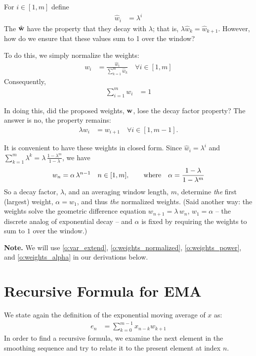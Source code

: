 \documentclass{article}
\begin{document}
For $i \in [1, m]$ define
\begin{align}
    {\hat w}_i &= \lambda^i 
\end{align}
The ${\hat {\bf w}}$ have the property that they decay with $\lambda$;
that is, $\lambda {\hat w}_{k} = {\hat w}_{k+1}$. However, how do we ensure that
these values sum to 1 over the window? 

To do this, we simply normalize the weights:
\begin{align}
    w_i &=  \frac{{\hat w}_i}{\sum_{k=1}^m {\hat w}_k} \quad \forall i \in [1, m] 
\end{align}
Consequently,
\begin{align}
    \sum_{i=1}^m w_i &= 1 \label{o:weights_normalized}
\end{align}

In doing this, did the proposed weights, ${\bf w}$, lose the decay factor
property? The answer is no, the property remains: 
\begin{align}
    \lambda w_{i} &= w_{i+1} \quad \forall i \in [1, m-1].  \label{o:weights_power}
\end{align}

It is convenient to have these weights in closed form. Since
${\hat w}_i = \lambda^i$ and
$\sum_{k=1}^m \lambda^k = \lambda \, \frac{1 - \lambda^m}{1 - \lambda}$, we have
\begin{equation}
	w_n = \alpha \, \lambda^{n-1} \quad n \in [1, m], \qquad \hbox{where} \quad
	\alpha = \frac{1 - \lambda}{1 - \lambda^m} \label{o:weights_alpha}
\end{equation}
So a decay factor, $\lambda$, and an averaging window length, $m$, determine
{\em the\/} first (largest) weight, $\alpha = w_1$, and thus {\em the\/}
normalized weights. (Said another way: the weights solve the geometric
difference equation $w_{n+1} = \lambda \, w_n$, $w_1 = \alpha$ -- the discrete
analog of exponential decay -- and $\alpha$ is fixed by requiring the weights
to sum to $1$ over the window.)

{\bf Note.} We will use \eqref{o:var_extend}, \eqref{o:weights_normalized},
\eqref{o:weights_power}, and \eqref{o:weights_alpha} in our derivations below.

\section{Recursive Formula for EMA}
We state again the definition of the exponential moving average of $x$ as:
\begin{align}
    e_n &= \sum_{k=0}^{m-1} x_{n-k} w_{k+1} 
\end{align}
In order to find a recursive formula, we examine the next element in the smoothing sequence 
and try to relate it to the present element at index $n$.
\end{document}
